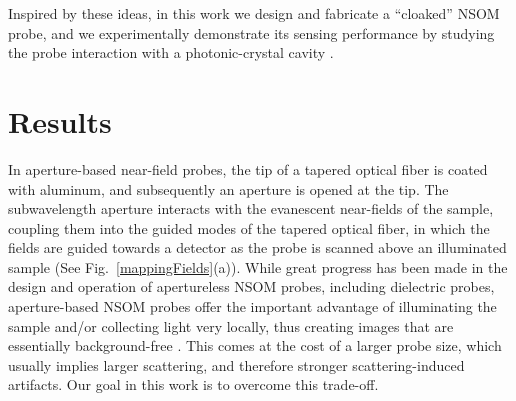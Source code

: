 \documentclass{osa-article}
\begin{document}
	Inspired by these ideas, in this work we design and fabricate a ``cloaked'' NSOM probe, and we experimentally demonstrate its sensing performance by studying the probe interaction with a photonic-crystal cavity \cite{Conteduca_2017}. 
	
	\section{Results}
	In aperture-based near-field probes, the tip of a tapered optical fiber is coated with aluminum, and subsequently an aperture is opened at the tip. The subwavelength aperture interacts with the evanescent near-fields of the sample, coupling them into the guided modes of the tapered optical fiber, in which the fields are guided towards a detector as the probe is scanned above an illuminated sample (See Fig.~\ref{mappingFields}(a)). While great progress has been made in the design and operation of apertureless NSOM probes, including dielectric probes, aperture-based NSOM probes offer the important advantage of illuminating the sample and/or collecting light very locally, thus creating images that are essentially background-free \cite{Novotny2006,fleischer2012near}. This comes at the cost of a larger probe size, which usually implies larger scattering, and therefore stronger scattering-induced artifacts. Our goal in this work is to overcome this trade-off. 
	
\end{document}
